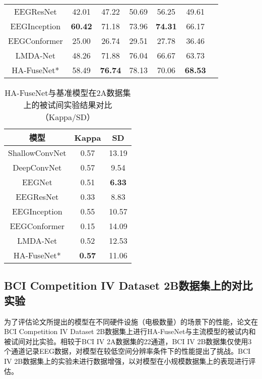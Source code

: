 \begin{table}[H]
\begin{subtable}[ht]{\textwidth}
\begin{tabularx}{\textwidth}{CCCCCCC}
        EEGResNet\cite{HBM:HBM23730}  & 42.01 & 47.22 & 50.69 & 56.25 & 49.61 \\
        EEGInception\cite{zhang2021eeg}  & \textbf{60.42} & 71.18 & 73.96 & \textbf{74.31} & 66.17 \\
        EEGConformer\cite{song2022eeg} & 25.00 & 26.74 & 29.51 & 27.78 & 36.46\\
        LMDA-Net\cite{miao2023lmda}  & 48.26 & 71.88 & 76.04 & 66.67 & 63.73\\
        HA-FuseNet*  & 58.49 & \textbf{76.74} & 78.13 & 70.06 & \textbf{68.53} \\
        \bottomrule
      \end{tabularx}
    \end{subtable}
\end{table}
\begin{table}[ht]
    \centering
    \caption{HA-FuseNet与基准模型在2A数据集上的被试间实验结果对比（Kappa/SD）}
    \label{tab:2acomparecrosssd}
    \begin{tabularx}{\textwidth}{CCC}
      \toprule
      模型 & Kappa & SD \\
      \midrule
      ShallowConvNet\cite{schirrmeister2017deep} &0.57&13.19 \\
      DeepConvNet\cite{schirrmeister2017deep} &0.57 &9.54\\
      EEGNet\cite{lawhern2018eegnet} &0.51& \textbf{6.33}\\
      EEGResNet\cite{HBM:HBM23730} &0.33&8.83\\
      EEGInception\cite{zhang2021eeg} &0.55&10.57\\
      EEGConformer\cite{song2022eeg}&0.15&14.09 \\
      LMDA-Net\cite{miao2023lmda} &0.52&12.53\\
      HA-FuseNet* &\textbf{0.57}&11.06\\
      \bottomrule
    \end{tabularx}
\end{table}


\subsection{BCI Competition IV Dataset 2B数据集上的对比实验}

为了评估论文所提出的模型在不同硬件设施（电极数量）的场景下的性能，论文在BCI Competition IV Dataset 2B数据集上进行HA-FuseNet与主流模型的被试内和被试间对比实验。相较于BCI IV 2A数据集的22通道，BCI IV 2B数据集仅使用3个通道记录EEG数据，对模型在较低空间分辨率条件下的性能提出了挑战。BCI IV 2B数据集上的实验未进行数据增强，以对模型在小规模数据集上的表现进行评估。

